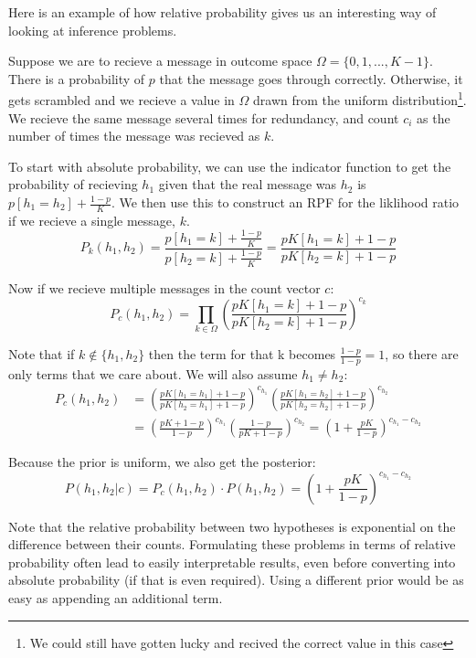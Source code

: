 \documentclass[twoside]{article}
\theoremstyle{plain}%
\theoremstyle{definition}
\theoremstyle{remark}
\begin{document}
Here is an example of how relative probability gives us an interesting way of looking at inference problems.

Suppose we are to recieve a message in outcome space \(\Omega = \{0, 1, ..., K-1\}\). There is a probability of \(p\) that the message goes through correctly. Otherwise, it gets scrambled and we recieve a value in \(\Omega\) drawn from the uniform distribution\footnote{We could still have gotten lucky and recived the correct value in this case}. We recieve the same message several times for redundancy, and count \(c_i\) as the number of times the message was recieved as \(k\).

To start with absolute probability, we can use the indicator function to get the probability of recieving \(h_1\) given that the real message was \(h_2\) is \(p[h_1 = h_2] + \frac{1-p}{K}\). We then use this to construct an RPF for the liklihood ratio if we recieve a single message, \(k\).
\[P_k(h_1, h_2) = \frac{p[h_1 = k] + \frac{1-p}{K}}{p[h_2 = k] + \frac{1-p}{K}} = \frac{pK[h_1 = k] + 1-p}{pK[h_2 = k] + 1-p}\]

Now if we recieve multiple messages in the count vector \(c\):
\[P_c(h_1, h_2) = \prod_{k \in \Omega}\left(\frac{pK[h_1 = k] + 1-p}{pK[h_2 = k] + 1-p}\right)^{c_k}\]

Note that if \(k \notin \{h_1, h_2\}\) then the term for that k becomes \(\frac{1-p}{1-p} = 1\), so there are only terms that we care about. We will also assume \(h_1 \neq h_2\):
\begin{equation}
\begin{aligned}
P_c(h_1, h_2) &= \left(\frac{pK[h_1 = h_1] + 1-p}{pK[h_2 = h_1] + 1-p}\right)^{c_{h_1}} \left(\frac{pK[h_1 = h_2] + 1-p}{pK[h_2 = h_2] + 1-p}\right)^{c_{h_2}} \\
& = \left(\frac{pK + 1-p}{1-p}\right)^{c_{h_1}} \left(\frac{1-p}{pK + 1-p}\right)^{c_{h_2}} = \left(1 + \frac{pK}{1-p}\right)^{c_{h_1} - c_{h_2}}
\end{aligned}
\end{equation}

Because the prior is uniform, we also get the posterior:
\[P(h_1, h_2 | c) = P_c(h_1, h_2) \cdot P(h_1, h_2) = \left(1 + \frac{pK}{1-p}\right)^{c_{h_1} - c_{h_2}} \]

Note that the relative probability between two hypotheses is exponential on the difference between their counts. Formulating these problems in terms of relative probability often lead to easily interpretable results, even before converting into absolute probability (if that is even required). Using a different prior would be as easy as appending an additional term.
\end{document}
